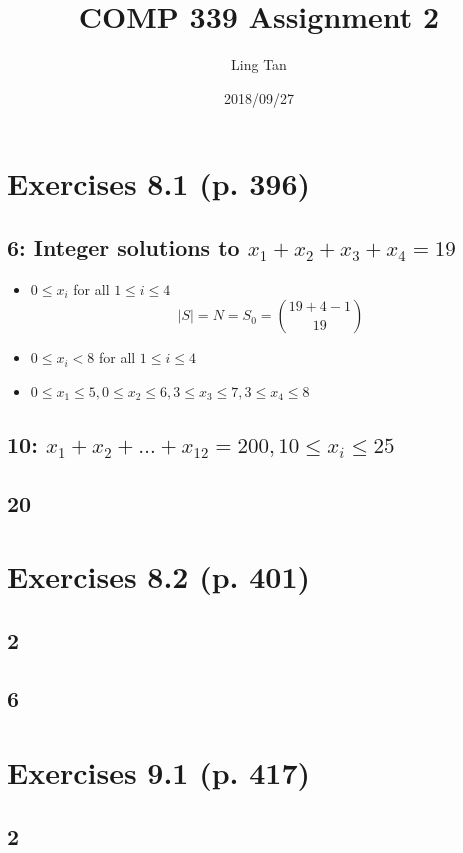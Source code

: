 \documentclass[a4paper]{article}
\title{COMP 339 Assignment 2}
\author{Ling Tan}
\date{2018/09/27}
\begin{document}
\maketitle

\section{Exercises 8.1 (p. 396)}
\subsection{6: Integer solutions to $x_1+x_2+x_3+x_4=19$}
\begin{itemize}
    \item $0\leq x_i$ for all $1\leq i\leq 4$\\
    $$|S| = N =S_0=\binom{19+4-1}{19}$$
    \item $0\leq x_i < 8$ for all $1\leq i\leq 4$\\
    
    \item $0\leq x_1 \leq 5, 0\leq x_2 \leq 6, 3\leq x_3 \leq 7, 3\leq x_4 \leq 8$
\end{itemize}
\subsection{10: $x_1+x_2+\dots+x_{12}=200,10\leq x_i\leq25$}
\subsection{20}

\section{Exercises 8.2 (p. 401)}
\subsection{2}
\subsection{6}
   
\section{Exercises 9.1 (p. 417) }
\subsection{2}
    
\end{document}
